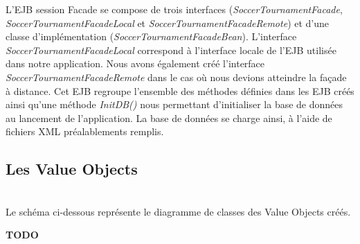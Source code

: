 \documentclass[10pt]{report}
\begin{document}
L'EJB session Facade se compose de trois interfaces (\textit{SoccerTournamentFacade}, \textit{SoccerTournamentFacadeLocal} et \textit{SoccerTournamentFacadeRemote}) et d'une classe d'implémentation (\textit{SoccerTournamentFacadeBean}). L'interface \textit{SoccerTournamentFacadeLocal} correspond à l'interface locale de l'EJB utilisée dans notre application. Nous avons également créé l'interface \textit{SoccerTournamentFacadeRemote} dans le cas où nous devions atteindre la façade à distance. Cet EJB regroupe l'ensemble des méthodes définies dans les EJB créés ainsi qu'une méthode \textit{InitDB()} nous permettant d'initialiser la base de données au lancement de l'application. La base de données se charge ainsi, à l'aide de fichiers XML préalablements remplis. 

\newpage
\subsection{Les Value Objects}
~\\
Le schéma ci-dessous représente le diagramme de classes des Value Objects créés. \\
	\begin{figure}[here]
	      \begin{center}
	      \end{center}
	\end{figure}
\textbf{TODO}

\newpage
\end{document}
